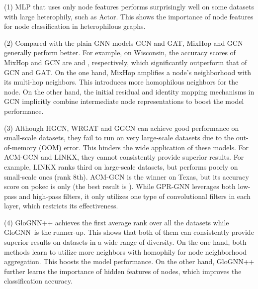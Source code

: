 \documentclass[nohyperref]{article}
\theoremstyle{plain}
\theoremstyle{definition}
\theoremstyle{remark}
\newcommand{\rom}[1]{\uppercase\expandafter{\romannumeral #1\relax}}
\newcommand{\ada}{GloGNN}
\begin{document}
(1) 
MLP that uses only node features performs surprisingly well on some datasets with large heterophily, such as Actor. 
This
shows the importance of node features for node classification in heterophilous graphs. 

(2)
Compared with the plain GNN models GCN and GAT,
MixHop and GCN\rom{2} generally perform better.
For example,
on Wisconsin, the accuracy scores of MixHop and GCN\rom{2} are  and , respectively,
which significantly outperform that of GCN and GAT. 
On the one hand,
MixHop 
amplifies a node's neighborhood with its multi-hop neighbors.
This introduces more homophilous neighbors for the node.
On the other hand,
the initial residual and identity mapping mechanisms in GCN\rom{2}
implicitly combine intermediate node representations to boost the model performance.




(3) Although HGCN, WRGAT and GGCN can achieve good performance on small-scale datasets,
they fail to run on very large-scale datasets due to the out-of-memory (OOM) error.
This hinders the wide application of these models.
For ACM-GCN and LINKX,
they cannot consistently provide superior results. 
For example,
LINKX ranks third on large-scale datasets,
but performs poorly on small-scale ones (rank 8th).
ACM-GCN is the winner on Texas, but its accuracy score on pokec is only  (the best result is ).
While GPR-GNN leverages both low-pass and high-pass filters,
it only utilizes one type of convolutional filters in each layer,
which restricts its effectiveness.


(4) \ada++ achieves the first average rank over all the datasets while \ada\ is the runner-up. 
This shows that 
both of them can consistently provide superior results on datasets in a wide range of diversity.
On the one hand,
both methods learn to utilize more neighbors with homophily for node neighborhood aggregation.
This
boosts the model performance.
On the other hand,
\ada++
further 
learns the importance of hidden features of nodes,
which improves the classification accuracy.
\end{document}
